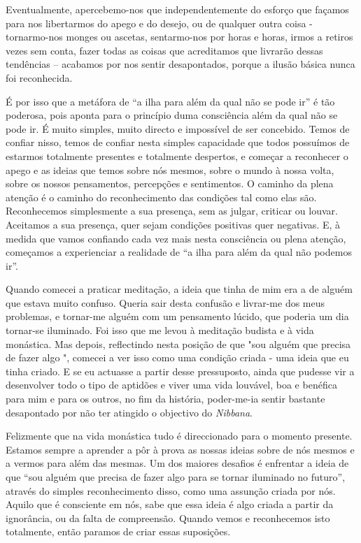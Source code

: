 Eventualmente, apercebemo-nos que independentemente do esforço que
façamos para nos libertarmos do apego e do desejo, ou de qualquer outra
coisa - tornarmo-nos monges ou ascetas, sentarmo-nos por horas e horas,
irmos a retiros vezes sem conta, fazer todas as coisas que acreditamos
que livrarão dessas tendências -- acabamos por nos sentir desapontados,
porque a ilusão básica nunca foi reconhecida.

É por isso que a metáfora de ``a ilha para além da qual não se pode ir''
é tão poderosa, pois aponta para o princípio duma consciência além da
qual não se pode ir. É muito simples, muito directo e impossível de ser
concebido. Temos de confiar nisso, temos de confiar nesta simples
capacidade que todos possuímos de estarmos totalmente presentes e
totalmente despertos, e começar a reconhecer o apego e as ideias que
temos sobre nós mesmos, sobre o mundo à nossa volta, sobre os nossos
pensamentos, percepções e sentimentos. O caminho da plena atenção é o
caminho do reconhecimento das condições tal como elas são. Reconhecemos
simplesmente a sua presença, sem as julgar, criticar ou louvar.
Aceitamos a sua presença, quer sejam condições positivas quer negativas.
E, à medida que vamos confiando cada vez mais nesta consciência ou plena
atenção, começamos a experienciar a realidade de ``a ilha para além da
qual não podemos ir''.

Quando comecei a praticar meditação, a ideia que tinha de mim era a de
alguém que estava muito confuso. Queria sair desta confusão e livrar-me
dos meus problemas, e tornar-me alguém com um pensamento lúcido, que
poderia um dia tornar-se iluminado. Foi isso que me levou à meditação
budista e à vida monástica. Mas depois, reflectindo nesta posição de que
"sou alguém que precisa de fazer algo ", comecei a ver isso como uma
condição criada - uma ideia que eu tinha criado. E se eu actuasse a
partir desse pressuposto, ainda que pudesse vir a desenvolver todo o
tipo de aptidões e viver uma vida louvável, boa e benéfica para mim e
para os outros, no fim da história, poder-me-ia sentir bastante
desapontado por não ter atingido o objectivo do \emph{Nibbana}.

Felizmente que na vida monástica tudo é direccionado para o momento
presente. Estamos sempre a aprender a pôr à prova as nossas ideias sobre
de nós mesmos e a vermos para além das mesmas. Um dos maiores desafios é
enfrentar a ideia de que ``sou alguém que precisa de fazer algo para se
tornar iluminado no futuro'', através do simples reconhecimento disso,
como uma assunção criada por nós. Aquilo que é consciente em nós, sabe
que essa ideia é algo criada a partir da ignorância, ou da falta de
compreensão. Quando vemos e reconhecemos isto totalmente, então paramos
de criar essas suposições.

